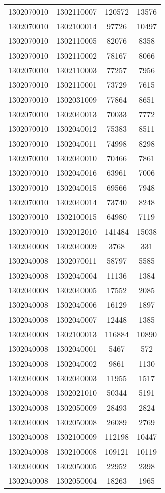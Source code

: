 \begin{longtable}{llcc}
1302070010 & 1302110007 & 120572 & 13576\\
1302070010 & 1302100014 & 97726 & 10497\\
1302070010 & 1302110005 & 82076 & 8358\\
1302070010 & 1302110002 & 78167 & 8066\\
1302070010 & 1302110003 & 77257 & 7956\\
1302070010 & 1302110001 & 73729 & 7615\\
1302070010 & 1302031009 & 77864 & 8651\\
1302070010 & 1302040013 & 70033 & 7772\\
1302070010 & 1302040012 & 75383 & 8511\\
1302070010 & 1302040011 & 74998 & 8298\\
1302070010 & 1302040010 & 70466 & 7861\\
1302070010 & 1302040016 & 63961 & 7006\\
1302070010 & 1302040015 & 69566 & 7948\\
1302070010 & 1302040014 & 73740 & 8248\\
1302070010 & 1302100015 & 64980 & 7119\\
1302070010 & 1302012010 & 141484 & 15038\\
1302040008 & 1302040009 & 3768 & 331\\
1302040008 & 1302070011 & 58797 & 5585\\
1302040008 & 1302040004 & 11136 & 1384\\
1302040008 & 1302040005 & 17552 & 2085\\
1302040008 & 1302040006 & 16129 & 1897\\
1302040008 & 1302040007 & 12448 & 1385\\
1302040008 & 1302100013 & 116884 & 10890\\
1302040008 & 1302040001 & 5467 & 572\\
1302040008 & 1302040002 & 9861 & 1130\\
1302040008 & 1302040003 & 11955 & 1517\\
1302040008 & 1302021010 & 50344 & 5191\\
1302040008 & 1302050009 & 28493 & 2824\\
1302040008 & 1302050008 & 26089 & 2769\\
1302040008 & 1302100009 & 112198 & 10447\\
1302040008 & 1302100008 & 109121 & 10119\\
1302040008 & 1302050005 & 22952 & 2398\\
1302040008 & 1302050004 & 18263 & 1965\\

\end{longtable}
